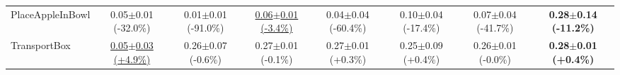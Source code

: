 \begin{table}[htbp]
\begin{adjustbox}{max width=\textwidth}
\begin{tabular}{l*{7}{c}}
PlaceAppleInBowl & 0.05$\pm$0.01 \scriptsize{(-32.0\%)} & 0.01$\pm$0.01 \scriptsize{(-91.0\%)} & \underline{0.06$\pm$0.01 \scriptsize{(-3.4\%)}} & 0.04$\pm$0.04 \scriptsize{(-60.4\%)} & 0.10$\pm$0.04 \scriptsize{(-17.4\%)} & 0.07$\pm$0.04 \scriptsize{(-41.7\%)} & \textbf{0.28$\pm$0.14 \scriptsize{(-11.2\%)}} \\
TransportBox & \underline{0.05$\pm$0.03 \scriptsize{(+4.9\%)}} & 0.26$\pm$0.07 \scriptsize{(-0.6\%)} & 0.27$\pm$0.01 \scriptsize{(-0.1\%)} & 0.27$\pm$0.01 \scriptsize{(+0.3\%)} & 0.25$\pm$0.09 \scriptsize{(+0.4\%)} & 0.26$\pm$0.01 \scriptsize{(-0.0\%)} & \textbf{0.28$\pm$0.01 \scriptsize{(+0.4\%)}} \\
\bottomrule
\end{tabular}
\end{adjustbox}
\end{table}

